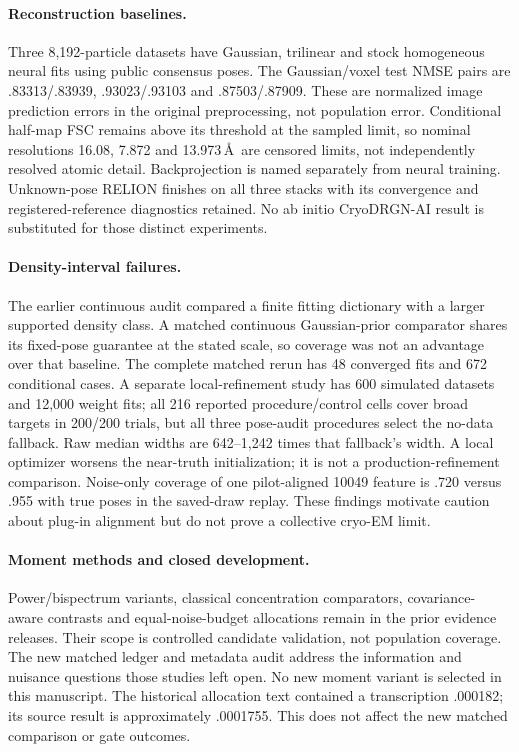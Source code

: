\paragraph{Reconstruction baselines.}
Three 8,192-particle datasets have Gaussian, trilinear and stock homogeneous
neural fits using public consensus poses. The Gaussian/voxel test NMSE pairs
are .83313/.83939, .93023/.93103 and .87503/.87909. These are normalized
image prediction errors in the original preprocessing, not population error.
Conditional half-map FSC remains above its threshold at the sampled limit,
so nominal resolutions 16.08, 7.872 and 13.973\,\AA\ are censored limits,
not independently resolved atomic detail. Backprojection is named separately
from neural training. Unknown-pose RELION finishes on all three stacks with
its convergence and registered-reference diagnostics retained. No ab initio
CryoDRGN-AI result is substituted for those distinct experiments.

\paragraph{Density-interval failures.}
The earlier continuous audit compared a finite fitting dictionary with a
larger supported density class. A matched continuous Gaussian-prior
comparator shares its fixed-pose guarantee at the stated scale, so coverage
was not an advantage over that baseline. The complete matched rerun has
48 converged fits and 672 conditional cases. A separate local-refinement
study has 600 simulated datasets and 12,000 weight fits; all 216 reported
procedure/control cells cover broad targets in 200/200 trials, but all three
pose-audit procedures select the no-data fallback. Raw median widths are
642--1,242 times that fallback's width. A local optimizer worsens the
near-truth initialization; it is not a production-refinement comparison.
Noise-only coverage of one pilot-aligned 10049 feature is .720 versus .955
with true poses in the saved-draw replay. These findings motivate caution
about plug-in alignment but do not prove a collective cryo-EM limit.

\paragraph{Moment methods and closed development.}
Power/bispectrum variants, classical concentration comparators, covariance-
aware contrasts and equal-noise-budget allocations remain in the prior
evidence releases. Their scope is controlled candidate validation, not
population coverage. The new matched ledger and metadata audit address
the information and nuisance questions those studies left open. No new
moment variant is selected in this manuscript. The historical allocation
text contained a transcription .000182; its source result is approximately
.0001755. This does not affect the new matched comparison or gate outcomes.

